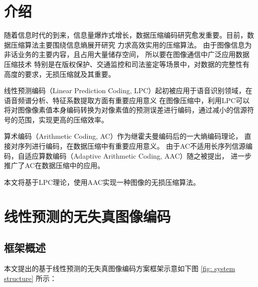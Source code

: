 \documentclass[12pt,a4paper]{article}%
\begin{document}



\newpage%


\section{介绍}
随着信息时代的到来，信息量爆炸式增长，数据压缩编码研究愈发重要。目前，数据压缩算法主要围绕信息熵展开研究
力求高效实用的压缩算法\cite[]{Ketshabetswe2021DataCompressionAlgorithms}。
由于图像信息为非话业务的主要内容，且占用大量储存空间，
所以要在图像通信中广泛应用数据压缩技术\cite[]{tang2022Shujuyasuojishuzaitongxinzhongdeyingyong}
特别是在版权保护、交通监控和司法鉴定等场景中，对数据的完整性有高度的要求，无损压缩就及其重要。

线性预测编码（Linear Prediction Coding, LPC）起初被应用于语音识别领域，在语音频谱分析、特征系数提取方面有重要应用意义
\cite[]{Javier2014ApplicationLinearPredictive,liu2014Gaoxiaodexianxingyuceyuyinbianmaxinxiyincangfangfa}
在图像压缩中，利用LPC可以将对图像像素值本身编码转换为对像素值的预测误差进行编码，通过减小的信源符号的范围，实现更高的压缩效率。

算术编码（Arithmetic Coding, AC）作为继霍夫曼编码后的一大熵编码理论\cite[]{Rissanen1979ArithmeticCoding}，
直接对序列进行编码，在数据压缩中有重要应用意义。
由于AC不适用长序列信源编码，自适应算数编码（Adaptive Arithmetic Coding, AAC）随之被提出\cite[]{Moffat1990LinearTimeAdaptive}，
进一步推广了AC在数据压缩中的应用。

本文将基于LPC理论，使用AAC实现一种图像的无损压缩算法。


\section{线性预测的无失真图像编码}

\subsection{框架概述}
本文提出的基于线性预测的无失真图像编码方案框架示意如下图 \ref{fig: system structure} 所示：
\end{document}
